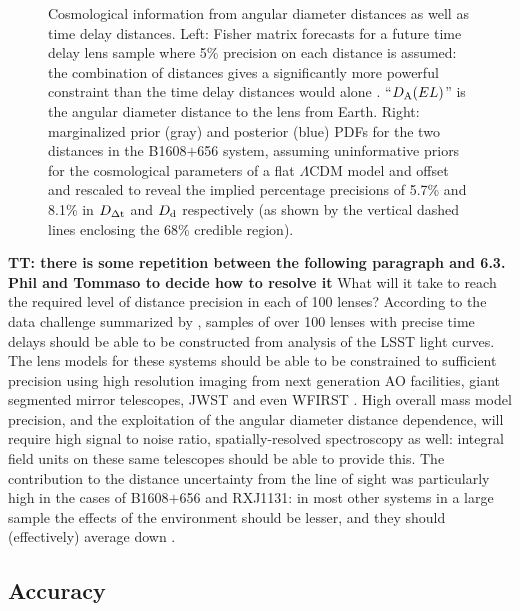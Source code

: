 \begin{figure}[!t]
\begin{minipage}{0.48\linewidth}
\end{minipage}
\caption{Cosmological information from angular diameter distances
as well as time delay distances. Left: Fisher matrix
forecasts for a future time delay lens sample where 5\% precision on
each distance is assumed: the combination of distances gives a
significantly more powerful constraint than the time delay distances
would alone \citep[reproduced from][]{JeeEtal2016}. ``$D_{\rm A}(EL)$'' is
the angular diameter distance to the lens from Earth. Right: marginalized
prior (gray) and posterior (blue) PDFs for the two
distances in the B1608$+$656 system, assuming uninformative priors for the
cosmological parameters of a flat $\Lambda$CDM model and offset and
rescaled to reveal the implied percentage precisions of 5.7\% and 8.1\%
in $D_{\Delta{\rm t}}$ and $D_{\rm d}$ respectively (as shown by the vertical dashed lines
enclosing the 68\% credible region). }
\label{fig:DdDdt}
\end{figure}


{\bf TT: there is some repetition between the following paragraph and
6.3. Phil and Tommaso to decide how to resolve it}
What will it take to reach the required level of distance precision in
each of 100 lenses?  According to the data challenge summarized by
\citet{LiaoEtal2015}, samples of over 100 lenses with
precise time delays should be able to be constructed from analysis of
the LSST light curves. The lens models for these systems should be
able to be constrained to sufficient precision using high resolution
imaging from next generation AO facilities, giant segmented mirror
telescopes, JWST and even WFIRST \citep{Men++15}. High overall mass
model precision, and the exploitation of the angular diameter distance
dependence, will require high signal to noise ratio,
spatially-resolved spectroscopy as well: integral field units on these
same telescopes should be able to provide this. The contribution to
the distance uncertainty from the line of sight was particularly high
in the cases of B1608$+$656 and RXJ1131: in most other systems in a
large sample the effects of the environment should be lesser, and they
should (effectively) average down \citep{ColletEtal2013}.



\subsection{Accuracy}
\label{ssec:accuracy}

